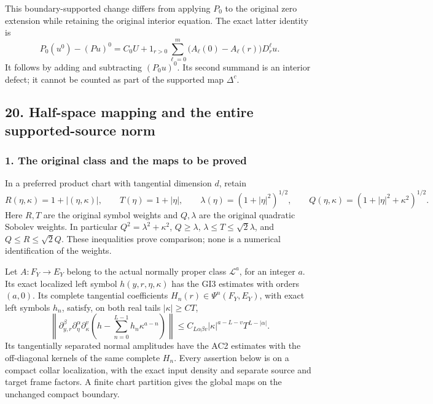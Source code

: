 \documentclass[
  11pt,
]{article}
\makeatletter
\let\ReaderOriginalAnchorStart\hyper@anchorstart
\let\ReaderOriginalAnchorEnd\hyper@anchorend
\let\ReaderPendingAliases\@empty
\def\ReaderArmAliases#1{\gdef\ReaderPendingAliases{#1}}
\def\hyper@anchorstart#1{\ReaderIfNativeAnchorTF{#1}{\ReaderPendingAliases\global\let\ReaderPendingAliases\@empty}{}\ReaderOriginalAnchorStart{#1}}
\makeatother
\begin{document}
This boundary-supported change differs from applying \(P_0\) to the
original zero extension while retaining the original interior equation.
The exact latter identity is \[
P_0(u^0)-(Pu)^0
=C_0U+1_{r>0}\sum_{\ell=0}^{m}
 \bigl(A_\ell(0)-A_\ell(r)\bigr)D_r^\ell u.
\tag{SR15a}
\] It follows by adding and subtracting \((P_0u)^0\). Its second summand
is an interior defect; it cannot be counted as part of the supported map
\(\Delta^c\).

\ReaderArmAliases{\ReaderOriginalAnchorStart{AN03-GCF-FOUNDATION-020}\ReaderOriginalAnchorEnd\begingroup\expandafter\def\csname @currentHref\endcsname{AN03-GCF-FOUNDATION-020}\label{AN03-GCF-FOUNDATION-020}\endgroup\ReaderOriginalAnchorStart{boundary-foundation-20}\ReaderOriginalAnchorEnd}
\subsection{20. Half-space mapping and the entire supported-source
norm}\label{boundary-foundation-20}

\subsubsection{1. The original class and the maps to be
proved}\label{the-original-class-and-the-maps-to-be-proved}

In a preferred product chart with tangential dimension \(d\), retain \[
 R(\eta,\kappa)=1+|(\eta,\kappa)|,
 \qquad T(\eta)=1+|\eta|,
 \qquad \lambda(\eta)=(1+|\eta|^2)^{1/2},
 \qquad Q(\eta,\kappa)=(1+|\eta|^2+\kappa^2)^{1/2}.
 \tag{MH1}
\] Here \(R,T\) are the original symbol weights and \(Q,\lambda\) are
the original quadratic Sobolev weights. In particular
\(Q^2=\lambda^2+\kappa^2\), \(Q\geq\lambda\),
\(\lambda\leq T\leq\sqrt2\lambda\), and \(Q\leq R\leq\sqrt2Q\). These
inequalities prove comparison; none is a numerical identification of the
weights.

Let \(A:F_Y\to E_Y\) belong to the actual normally proper class
\(\mathcal L^a\), for an integer \(a\). Its exact localized left symbol
\(h(y,r,\eta,\kappa)\) has the GI3 estimates with orders \((a,0)\). Its
complete tangential coefficients \(H_n(r)\in\Psi^n(F_Y,E_Y)\), with
exact left symbols \(h_n\), satisfy, on both real tails
\(|\kappa|\geq CT\), \[
 \left\|\partial_{y,r}^{\beta}\partial_\eta^{\alpha}
 \partial_\kappa^v
 \left(h-\sum_{n=0}^{L-1}h_n\kappa^{a-n}\right)\right\|
 \leq C_{L\alpha\beta v}|\kappa|^{a-L-v}T^{L-|\alpha|}.
 \tag{MH2}
\] Its tangentially separated normal amplitudes have the AC2 estimates
with the off-diagonal kernels of the same complete \(H_n\). Every
assertion below is on a compact collar localization, with the exact
input density and separate source and target frame factors. A finite
chart partition gives the global maps on the unchanged compact boundary.
\end{document}
